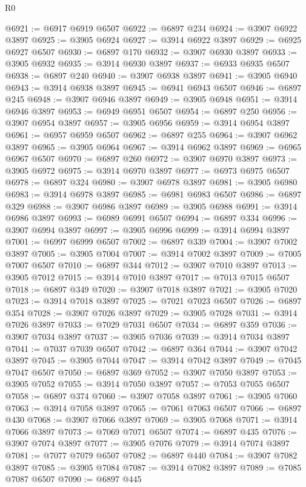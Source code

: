 \begin{lexlean}{R0}
\begin{coremodule}
@6921 := @6917 @6919 @6507
@6922 := @6897 @234
@6924 := @3907 @6922 @3897
@6925 := @3905 @6924
@6927 := @3914 @6922 @3897
@6929 := @6925 @6927 @6507
@6930 := @6897 @170
@6932 := @3907 @6930 @3897
@6933 := @3905 @6932
@6935 := @3914 @6930 @3897
@6937 := @6933 @6935 @6507
@6938 := @6897 @240
@6940 := @3907 @6938 @3897
@6941 := @3905 @6940
@6943 := @3914 @6938 @3897
@6945 := @6941 @6943 @6507
@6946 := @6897 @245
@6948 := @3907 @6946 @3897
@6949 := @3905 @6948
@6951 := @3914 @6946 @3897
@6953 := @6949 @6951 @6507
@6954 := @6897 @250
@6956 := @3907 @6954 @3897
@6957 := @3905 @6956
@6959 := @3914 @6954 @3897
@6961 := @6957 @6959 @6507
@6962 := @6897 @255
@6964 := @3907 @6962 @3897
@6965 := @3905 @6964
@6967 := @3914 @6962 @3897
@6969 := @6965 @6967 @6507
@6970 := @6897 @260
@6972 := @3907 @6970 @3897
@6973 := @3905 @6972
@6975 := @3914 @6970 @3897
@6977 := @6973 @6975 @6507
@6978 := @6897 @324
@6980 := @3907 @6978 @3897
@6981 := @3905 @6980
@6983 := @3914 @6978 @3897
@6985 := @6981 @6983 @6507
@6986 := @6897 @329
@6988 := @3907 @6986 @3897
@6989 := @3905 @6988
@6991 := @3914 @6986 @3897
@6993 := @6989 @6991 @6507
@6994 := @6897 @334
@6996 := @3907 @6994 @3897
@6997 := @3905 @6996
@6999 := @3914 @6994 @3897
@7001 := @6997 @6999 @6507
@7002 := @6897 @339
@7004 := @3907 @7002 @3897
@7005 := @3905 @7004
@7007 := @3914 @7002 @3897
@7009 := @7005 @7007 @6507
@7010 := @6897 @344
@7012 := @3907 @7010 @3897
@7013 := @3905 @7012
@7015 := @3914 @7010 @3897
@7017 := @7013 @7015 @6507
@7018 := @6897 @349
@7020 := @3907 @7018 @3897
@7021 := @3905 @7020
@7023 := @3914 @7018 @3897
@7025 := @7021 @7023 @6507
@7026 := @6897 @354
@7028 := @3907 @7026 @3897
@7029 := @3905 @7028
@7031 := @3914 @7026 @3897
@7033 := @7029 @7031 @6507
@7034 := @6897 @359
@7036 := @3907 @7034 @3897
@7037 := @3905 @7036
@7039 := @3914 @7034 @3897
@7041 := @7037 @7039 @6507
@7042 := @6897 @364
@7044 := @3907 @7042 @3897
@7045 := @3905 @7044
@7047 := @3914 @7042 @3897
@7049 := @7045 @7047 @6507
@7050 := @6897 @369
@7052 := @3907 @7050 @3897
@7053 := @3905 @7052
@7055 := @3914 @7050 @3897
@7057 := @7053 @7055 @6507
@7058 := @6897 @374
@7060 := @3907 @7058 @3897
@7061 := @3905 @7060
@7063 := @3914 @7058 @3897
@7065 := @7061 @7063 @6507
@7066 := @6897 @430
@7068 := @3907 @7066 @3897
@7069 := @3905 @7068
@7071 := @3914 @7066 @3897
@7073 := @7069 @7071 @6507
@7074 := @6897 @435
@7076 := @3907 @7074 @3897
@7077 := @3905 @7076
@7079 := @3914 @7074 @3897
@7081 := @7077 @7079 @6507
@7082 := @6897 @440
@7084 := @3907 @7082 @3897
@7085 := @3905 @7084
@7087 := @3914 @7082 @3897
@7089 := @7085 @7087 @6507
@7090 := @6897 @445

\end{coremodule}
\end{lexlean}
